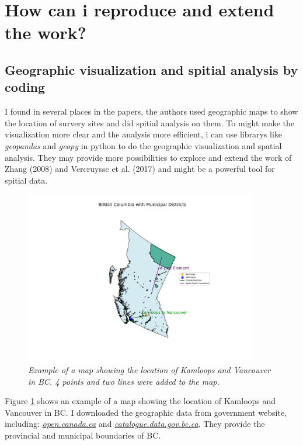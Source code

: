 \documentclass{article}
\begin{document}
\newpage

\newpage

\newpage

\section{How can i reproduce and extend the work?}
\subsection{Geographic visualization and spitial analysis by coding}

I found in several places in the papers, the authors used geographic maps to show the location of 
survery sites and did spitial analysis on them. To might make the visualization more clear and the analysis
more efficient, i can use librarys like \textit{geopandas} and \textit{geopy} 
in python to do the geographic visualization and spatial analysis. 
They may provide more possibilities to explore and extend the work of Zhang (2008) and Vercruysse et al. (2017) and might
be a powerful tool for spitial data.


\begin{figure}[!h]
    \centering
    \includegraphics[width=0.9\textwidth]{../src_test/results/test_BC_map.png}
    \caption{\textit{Example of a map showing the location of Kamloops and Vancouver in BC. 4 points and two lines were added to the map.}}
    \label{fig:test_BC_map}
\end{figure}

Figure \ref{fig:test_BC_map} shows an example of a map showing the location of Kamloops and Vancouver in BC.
I downloaded the geographic data from government website, including: \href{https://open.canada.ca/data/en/dataset/a883eb14-0c0e-45c4-b8c4-b54c4a819edb/resource/12c03de6-c3f7-4f5f-bb5c-d479f2332842}{\textit{open.canada.ca}} and 
\href{https://catalogue.data.gov.bc.ca/dataset/municipalities-legally-defined-administrative-areas-of-bc/resource/0bd8e3d1-4d7f-4db8-a8b2-2cd4cd051074}{\textit{catalogue.data.gov.bc.ca}}. They provide the provincial and municipal boundaries of BC.
\end{document}
